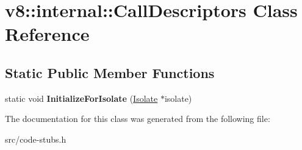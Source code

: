 \hypertarget{classv8_1_1internal_1_1_call_descriptors}{}\section{v8\+:\+:internal\+:\+:Call\+Descriptors Class Reference}
\label{classv8_1_1internal_1_1_call_descriptors}
\subsection*{Static Public Member Functions}
\begin{DoxyCompactItemize}
\item 
\hypertarget{classv8_1_1internal_1_1_call_descriptors_a0bbaabc00f849c11f954a51d89937a62}{}static void {\bfseries Initialize\+For\+Isolate} (\hyperlink{classv8_1_1internal_1_1_isolate}{Isolate} $\ast$isolate)\label{classv8_1_1internal_1_1_call_descriptors_a0bbaabc00f849c11f954a51d89937a62}

\end{DoxyCompactItemize}


The documentation for this class was generated from the following file\+:\begin{DoxyCompactItemize}
\item 
src/code-\/stubs.\+h\end{DoxyCompactItemize}

